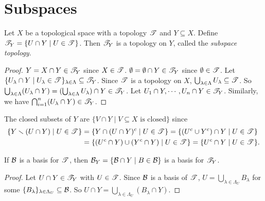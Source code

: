 \section*{Subspaces}

\begin{proposition}\label{2.21}
    Let $X$ be a topological space with a topology $\mathscr{T}$ and $Y \subseteq X$. Define $\mathscr{T}_Y = \{U \cap Y \mid U \in \mathscr{T}\}$. Then $\mathscr{T}_Y$ is a topology on $Y$, called the \emph{subspace topology}.
\end{proposition}

\begin{proof}
    $Y = X \cap Y \in \mathscr{T}_Y$ since $X \in \mathscr{T}$. $\emptyset = \emptyset \cap Y  \in \mathscr{T}_Y$ since $\emptyset \in \mathscr{T}$. Let $\{U_\lambda \cap Y \mid U_\lambda \in \mathscr{T}\}_{\lambda \in \Lambda} \subseteq \mathscr{T}_Y$. Since $\mathscr{T}$ is a topology on $X$, $\bigcup_{\lambda \in \Lambda} U_\lambda \subseteq \mathscr{T}$. So $\bigcup_{\lambda \in \Lambda} (U_\lambda \cap Y) = (\bigcup_{\lambda \in \Lambda}U_\lambda) \cap Y \in \mathscr{T}_Y$. Let $U_1 \cap Y,\cdots,U_n \cap Y \in \mathscr{T}_Y$. Similarly, we have $\bigcap_{i=1}^n (U_\lambda \cap Y) \in \mathscr{T}_Y$. 
\end{proof}

\begin{remark}
    The closed subsets of $Y$ are $\{V \cap Y \mid V \subseteq X \text{ is closed}\}$ since 
    \begin{align*}
        \{Y \smallsetminus (U \cap Y) \mid U \in \mathscr{T}\} &= \{Y \cap (U \cap Y)^c \mid U \in \mathscr{T}\} = \{(U^c \cup Y^c) \cap Y \mid U \in \mathscr{T}\} \\
                                                   &= \{(U^c \cap Y) \cup (Y^c \cap Y) \mid U \in \mathscr{T}\} = \{U^c \cap Y \mid U \in \mathscr{T}\}.
    \end{align*}
\end{remark}

\begin{proposition}\label{2.22}
    If $\mathcal{B}$ is a basis for $\mathscr{T}$, then $\mathcal{B}_Y = \{\mathcal{B} \cap Y \mid B \in \mathcal{B}\}$ is a basis for $\mathscr{T}_Y$.
\end{proposition}

\begin{proof}
    Let $U \cap Y \in \mathscr{T}_Y$ with $U \in \mathscr{T}$. Since $\mathcal{B}$ is a basis of $\mathscr{T}$, $U = \bigcup_{\lambda \in \Lambda_U} B_\lambda$ for some $\{B_\lambda\}_{\lambda \in \Lambda_U} \subseteq \mathcal{B}$. So $U \cap Y = \bigcup_{\lambda \in \Lambda_U} (B_\lambda \cap Y)$. 
\end{proof}

